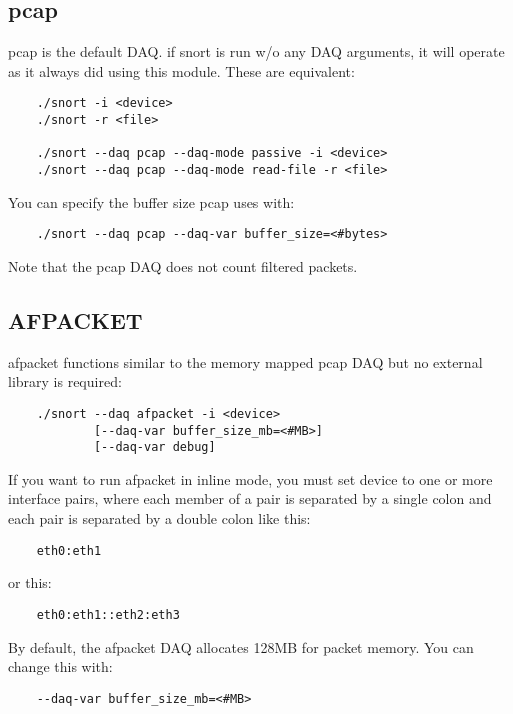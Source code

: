 \documentclass[english]{report}
\begin{document}
\subsection{pcap}

pcap is the default DAQ.  if snort is run w/o any DAQ arguments, it will
operate as it always did using this module.  These are equivalent:

\begin{verbatim}
    ./snort -i <device>
    ./snort -r <file>

    ./snort --daq pcap --daq-mode passive -i <device>
    ./snort --daq pcap --daq-mode read-file -r <file>
\end{verbatim}

You can specify the buffer size pcap uses with:

\begin{verbatim}
    ./snort --daq pcap --daq-var buffer_size=<#bytes>
\end{verbatim}

Note that the pcap DAQ does not count filtered packets.

\subsection{AFPACKET}

afpacket functions similar to the memory mapped pcap DAQ but no external 
library is required:

\begin{verbatim}
    ./snort --daq afpacket -i <device>
            [--daq-var buffer_size_mb=<#MB>]
            [--daq-var debug]
\end{verbatim}

If you want to run afpacket in inline mode, you must set device to one or more
interface pairs, where each member of a pair is separated by a single colon and 
each pair is separated by a double colon like this:

\begin{verbatim}
    eth0:eth1
\end{verbatim}

or this:

\begin{verbatim}
    eth0:eth1::eth2:eth3
\end{verbatim}

By default, the afpacket DAQ allocates 128MB for packet memory.  You can change
this with:

\begin{verbatim}
    --daq-var buffer_size_mb=<#MB>
\end{verbatim}
\end{document}
